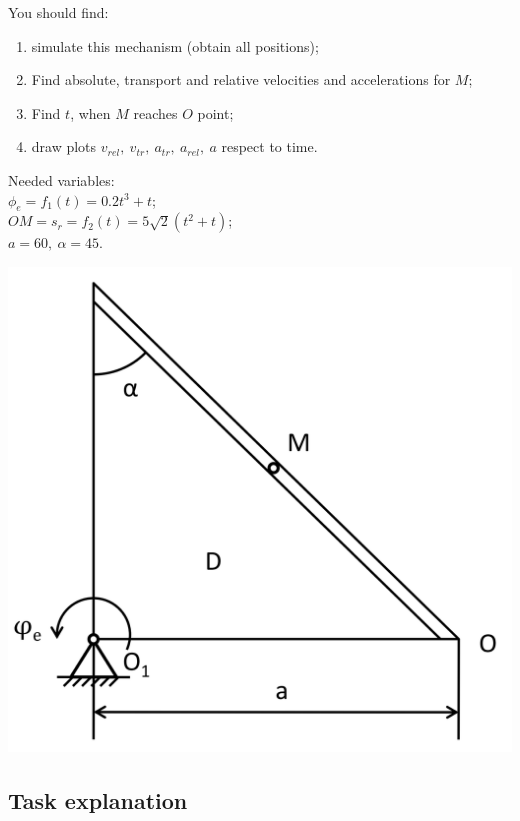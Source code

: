 \documentclass{article}
\begin{document}
\noindent
\begin{minipage}{0.6\textwidth}
      You should find:
      \begin{enumerate}
          \item simulate this mechanism (obtain all positions);
          \item Find absolute, transport and relative velocities and accelerations for $M$;
          \item Find $t$, when $M$ reaches $O$ point;
          \item draw plots $v_{rel},\ v_{tr},\ a_{tr},\ a_{rel},\ a$ respect to time.
      \end{enumerate}
      Needed variables:\\
      $\phi_e=f_1(t)=0.2t^3+t$;\\
      $OM=s_r=f_2(t)=5\sqrt{2}(t^2+t)$;\\
      $a=60,\ \alpha = 45$.
\end{minipage}
\hfill
\begin{minipage}{0.39\textwidth}
    \includegraphics[width=\textwidth]{HW3_2.png}
\end{minipage}

\subsection{Task explanation}
\end{document}
